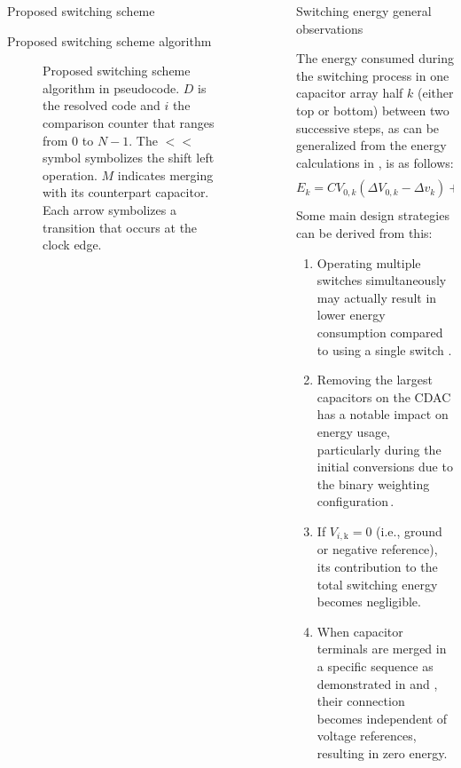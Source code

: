 \documentclass[final]{beamer}
\newlength{\sepwidth}
\newlength{\colwidth}
\newcommand{\separatorcolumn}{\begin{column}{\sepwidth}\end{column}}
\begin{document}
\begin{frame}[t]
\begin{columns}[t]
\begin{column}{\colwidth}
\begin{block}{Proposed switching scheme}
  \end{block}

  \begin{block}{Proposed switching scheme algorithm}

      \begin{figure} \centering
              \centering
      	    
              \caption{Proposed switching scheme algorithm in pseudocode. $D$ is the resolved code and $i$ the comparison counter that ranges from $0$ to $N-1$. The $<<$ symbol symbolizes the shift left operation. $M$ indicates merging with its counterpart capacitor. Each arrow symbolizes a transition that occurs at the clock edge.}
              \label{fig:algo}
      \end{figure}

  \end{block}

  

\end{column}

\separatorcolumn

\begin{column}{\colwidth}

\begin{block}{Switching energy general observations}

    The energy consumed during the switching process in one capacitor array half $k$ (either top or bottom) between two successive steps, as can be generalized from the energy calculations in \cite{Ginsburg}, is as follows:
    \begin{equation} \label{eq:e}
        E_{k} = C V_{0,k} \left( \Delta V_{0,k} - \Delta v_{k} \right) + \sum_{i=0}^{N-3} 2^i C V_{i+1,k} \left( \Delta V_{i+1,k} - \Delta v_{k} \right) \ .
    \end{equation}
    Some main design strategies can be derived from this: 
    \begin{enumerate}
      \item Operating multiple switches simultaneously may actually result in lower energy consumption compared to using a single switch \cite{Xin21}.
      \item Removing the largest capacitors on the  CDAC has a notable impact on energy usage, particularly during the initial conversions due to the binary weighting configuration\,\cite{Yuan12, Sanyal13, Zhu13}. 
      \item If $V_{i,\text{k}} = 0$ (i.e., ground or negative reference), its contribution to the total switching energy becomes negligible. 
      \item When capacitor terminals are merged in a specific sequence as demonstrated in \cite{Xin21} and \cite{Wu17}, their connection becomes independent of voltage references, resulting in zero energy.
    \end{enumerate}


\end{block}
\end{column}
\end{columns}
\end{frame}
\end{document}
